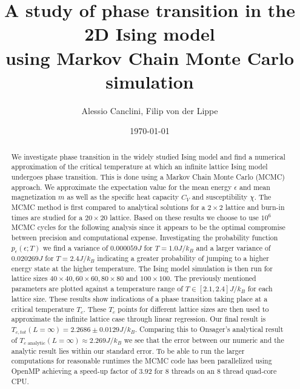 \documentclass[english,notitlepage,reprint,nofootinbib]{revtex4-1}  %
\begin{document}
\title{A study of phase transition in the 2D Ising model\\using Markov Chain Monte Carlo simulation}  %
\author{Alessio Canclini, Filip von der Lippe} %
\date{\today}                             %
\noaffiliation                            %

\begin{abstract}
    We investigate phase transition in the widely studied Ising model and find a numerical approximation of the critical temperature at which an infinite lattice Ising model undergoes phase transition. This is done using a Markov Chain Monte Carlo (MCMC) approach. We approximate the expectation value for the mean energy $\epsilon$ and mean magnetization $m$ as well as the specific heat capacity $C_V$ and susceptibility $\chi$. The MCMC method is first compared to analytical solutions for a $2 \times 2$ lattice and burn-in times are studied for a $20 \times 20$ lattice. Based on these results we choose to use $10^6$ MCMC cycles for the following analysis since it appears to be the optimal compromise between precision and computational expense. Investigating the probability function $p_{\epsilon}(\epsilon ; T)$ we find a variance of $0.000059J$ for $T=1.0J/k_B$ and a larger variance of $0.020269J$ for $T=2.4J/k_B$ indicating a greater probability of jumping to a higher energy state at the higher temperature. The Ising model simulation is then run for lattice sizes $40 \times 40, 60 \times 60, 80 \times 80$ and $100\times 100$. The previously mentioned parameters are plotted against a temperature range of $T \in [2.1,2.4]J/k_B$ for each lattice size. These results show indications of a phase transition taking place at a critical temperature $T_c$. These $T_c$ points for different lattice sizes are then used to approximate the infinite lattice case through linear regression. Our final result is $T_{c,tot}(L=\infty) = 2.2686 \pm 0.0129  J/k_B$. Comparing this to Onsager's analytical result of  $T_{c \text{ analytic}}(L=\infty) \approx 2.269 J/k_B$ we see that the error between our numeric and the analytic result lies within our standard error. To be able to run the larger computations for reasonable runtimes the MCMC code has been parallelized using OpenMP achieving a speed-up factor of $3.92$ for 8 threads on an 8 thread quad-core CPU.
\end{abstract}
\maketitle
\raggedbottom
\end{document}
